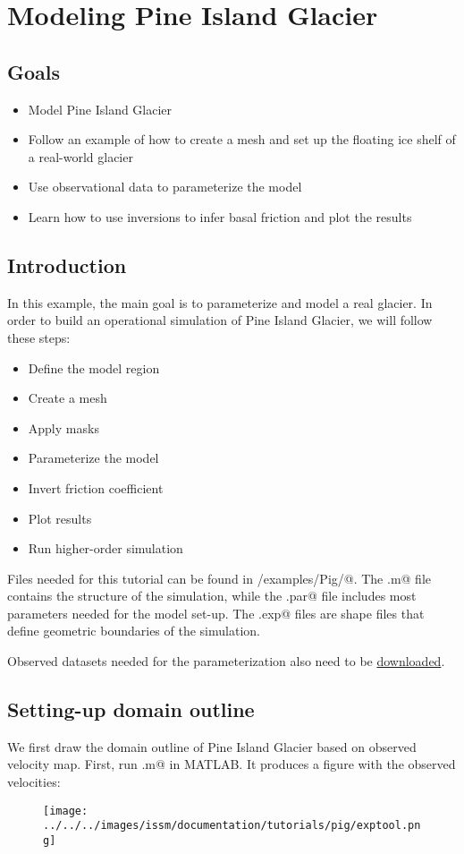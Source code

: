 \section{Modeling Pine Island Glacier}
\subsection{Goals} %
\begin{itemize}
	\item Model Pine Island Glacier
	\item Follow an example of how to create a mesh and set up the floating ice shelf of a real-world glacier
	\item Use observational data to parameterize the model
	\item Learn how to use inversions to infer basal friction and plot the results
\end{itemize}
\subsection{Introduction}%
In this example, the main goal is to parameterize and model a real glacier. In order to build an operational simulation of Pine Island Glacier, we will follow these steps:
\begin{itemize}
	\item Define the model region
	\item Create a mesh
	\item Apply masks
	\item Parameterize the model
	\item Invert friction coefficient
	\item Plot results
	\item Run higher-order simulation
\end{itemize}

Files needed for this tutorial can be found in \verb@trunk/examples/Pig/@. The \verb@runme.m@ file contains the structure of the simulation, while the \verb@.par@ file includes most parameters needed for the model set-up. The \verb@.exp@ files are shape files that define geometric boundaries of the simulation.

Observed datasets needed for the parameterization also need to be \href{https://issm.jpl.nasa.gov/documentation/tutorials/datasets/}{downloaded}.
\subsection{Setting-up domain outline} %
We first draw the domain outline of Pine Island Glacier based on observed velocity map. First, run \verb@PigRegion.m@ in MATLAB. It produces a figure with the observed velocities:
\begin{figure}[H]
	\begin{center}
		\texttt{[image: ../../../images/issm/documentation/tutorials/pig/exptool.png]}
	\end{center}
\end{figure}

